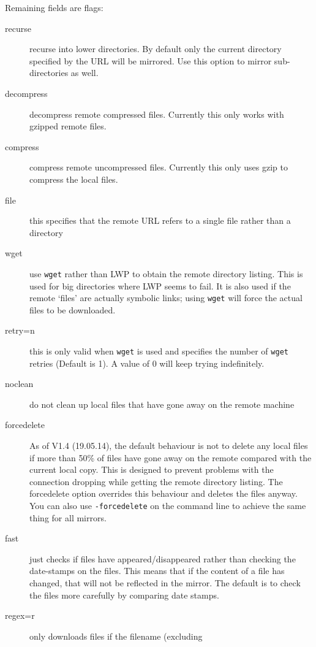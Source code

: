 \documentclass{article}
\begin{document}
Remaining fields are flags:
\begin{description}
\item[recurse]    recurse into lower directories. By default only the
  current directory specified by the URL will be mirrored. Use this
  option to mirror sub-directories as well.
\item[decompress] decompress remote compressed files. Currently this
  only works with gzipped remote files.
\item[compress]   compress remote uncompressed files. Currently this
  only uses gzip to compress the local files.
\item[file]       this specifies that the remote URL refers to a
  single file rather than a directory
\item[wget]       use \verb|wget| rather than LWP to obtain the remote
  directory listing. This is used for big directories where LWP seems
  to fail. It is also used if the remote `files' are actually symbolic
  links; using \verb|wget| will force the actual files to be downloaded.
\item[retry=n]    this is only valid when \verb|wget| is used and specifies
                  the number of \verb|wget| retries (Default is 1).
                  A value of 0 will keep trying indefinitely.
\item[noclean]    do not clean up local files that have gone away on the
                  remote machine
\item[forcedelete] As of V1.4 (19.05.14), the default behaviour is not
                   to delete any local files if more than 50\% of
                   files have gone away on the remote compared with
                   the current local copy. This is designed to prevent
                   problems with the connection dropping while getting
                   the remote directory listing. The forcedelete
                   option overrides this behaviour and deletes the
                   files anyway. You can also use \verb|-forcedelete|
                   on the command line to achieve the same thing for
                   all mirrors.
\item[fast] just checks if files have appeared/disappeared rather than
                  checking the date-stamps on the files. This means
                  that if the content of a file has changed, that will
                  not be reflected in the mirror. The default is to
                  check the files more carefully by comparing date
                  stamps.
\item[regex=r]    only downloads files if the filename (excluding

\end{description}
\end{document}
